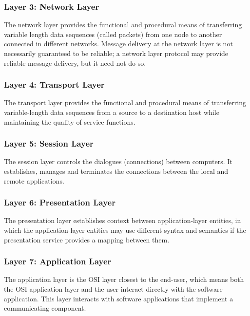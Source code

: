 \subsubsection{Layer 3: Network Layer}
\vspace{12pt}
The network layer provides the functional and procedural means of transferring variable length data sequences (called packets) from one node to another connected in different networks. Message delivery at the network layer is not necessarily guaranteed to be reliable; a network layer protocol may provide reliable message delivery, but it need not do so.

\vspace{12pt}
\subsubsection{Layer 4: Transport Layer}
\vspace{12pt}
The transport layer provides the functional and procedural means of transferring variable-length data sequences from a source to a destination host while maintaining the quality of service functions.
\vspace{12pt}
\subsubsection{Layer 5: Session Layer}
\vspace{12pt}
The session layer controls the dialogues (connections) between computers. It establishes, manages and terminates the connections between the local and remote applications. 
\vspace{12pt}
\subsubsection{Layer 6: Presentation Layer}
\vspace{12pt}
The presentation layer establishes context between application-layer entities, in which the application-layer entities may use different syntax and semantics if the presentation service provides a mapping between them.
\vspace{12pt}
\subsubsection{Layer 7: Application Layer}
\vspace{12pt}
The application layer is the OSI layer closest to the end-user, which means both the OSI application layer and the user interact directly with the software application. This layer interacts with software applications that implement a communicating component.
\vspace{12pt}
